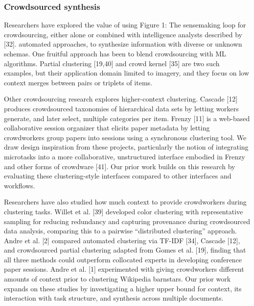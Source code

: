 \documentclass[journal]{vgtc}                %
\begin{document}
\subsubsection{Crowdsourced synthesis}
Researchers have explored the value of using Figure 1: The sensemaking loop for crowdsourcing, either alone or combined with intelligence analysts described by [32]. automated approaches, to synthesize information with diverse or unknown schemas. One fruitful approach has been to blend crowdsourcing with ML algorithms. Partial clustering [19,40] and crowd kernel [35] are two such examples, but their application domain limited to imagery, and they focus on low context merges between pairs or triplets of items.

Other crowdsourcing research explores higher-context clustering. Cascade [12] produces crowdsourced taxonomies of hierarchical data sets by letting workers generate, and later select, multiple categories per item. Frenzy [11] is a web-based collaborative session organizer that elicits paper metadata by letting crowdworkers group papers into sessions using a synchronous clustering tool. We draw design inspiration from these projects, particularly the notion of integrating microtasks into a more collaborative, unstructured interface embodied in Frenzy and other forms of crowdware [41]. Our prior work builds on this research by evaluating these clustering-style interfaces compared to other interfaces and workflows.

Researchers have also studied how much context to provide crowdworkers during clustering tasks. Willet et al. [39] developed color clustering with representative sampling for reducing redundancy and capturing provenance during crowdsourced data analysis, comparing this to a pairwise “distributed clustering” approach. Andre et al. [2] compared automated clustering via TF-IDF [34], Cascade [12], and crowdsourced partial clustering adapted from Gomes et al. [19], finding that all three methods could outperform collocated experts in developing conference paper sessions. Andre et al. [1] experimented with giving crowdworkers different amounts of context prior to clustering Wikipedia barnstars. Our prior work expands on these studies by investigating a higher upper bound for context, its interaction with task structure, and synthesis across multiple documents.
\end{document}
